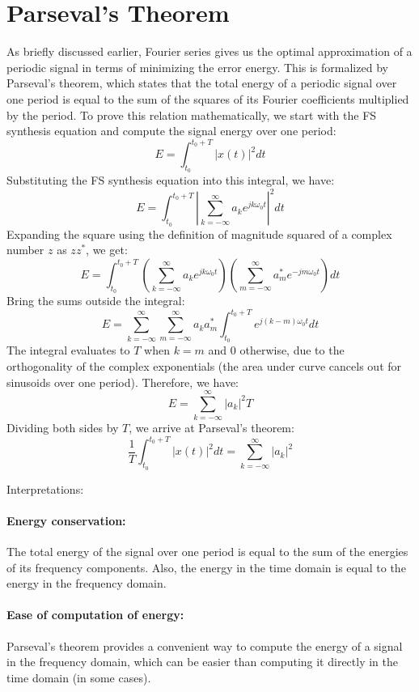 \documentclass{ee102_notes}
\begin{document}
\section{Parseval's Theorem}
As briefly discussed earlier, Fourier series gives us the optimal approximation of a periodic signal in terms of minimizing the error energy. This is formalized by Parseval's theorem, which states that the total energy of a periodic signal over one period is equal to the sum of the squares of its Fourier coefficients multiplied by the period. To prove this relation mathematically, we start with the FS synthesis equation and compute the signal energy over one period:
\[
E = \int_{t_0}^{t_0+T} |x(t)|^2 dt
\]
Substituting the FS synthesis equation into this integral, we have:
\[
E = \int_{t_0}^{t_0+T} \left| \sum_{k=-\infty}^{\infty} a_k e^{j k \omega_0 t} \right|^2 dt
\]
Expanding the square using the definition of magnitude squared of a complex number \(z\) as \(z z^*\), we get:
\[
E = \int_{t_0}^{t_0+T} \left( \sum_{k=-\infty}^{\infty} a_k e^{j k \omega_0 t} \right) \left( \sum_{m=-\infty}^{\infty} a_m^* e^{-j m \omega_0 t} \right) dt
\]
Bring the sums outside the integral:
\[
E = \sum_{k=-\infty}^{\infty} \sum_{m=-\infty}^{\infty} a_k a_m^* \int_{t_0}^{t_0+T} e^{j (k - m) \omega_0 t} dt
\]
The integral evaluates to \(T\) when \(k = m\) and \(0\) otherwise, due to the orthogonality of the complex exponentials (the area under curve cancels out for sinusoids over one period). Therefore, we have:
\[
E = \sum_{k=-\infty}^{\infty} |a_k|^2 T
\]
Dividing both sides by \(T\), we arrive at Parseval's theorem:
\[
\frac{1}{T} \int_{t_0}^{t_0+T} |x(t)|^2 dt = \sum_{k=-\infty}^{\infty} |a_k|^2
\]

Interpretations:

\paragraph{Energy conservation:} 

The total energy of the signal over one period is equal to the sum of the energies of its frequency components. Also, the energy in the time domain is equal to the energy in the frequency domain.

\paragraph{Ease of computation of energy:} Parseval's theorem provides a convenient way to compute the energy of a signal in the frequency domain, which can be easier than computing it directly in the time domain (in some cases).
\end{document}
